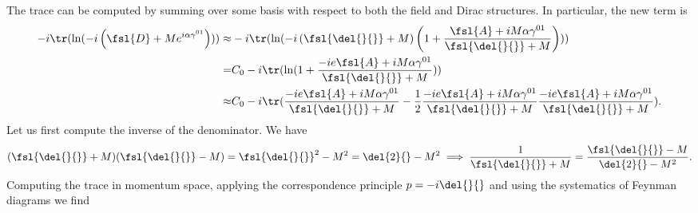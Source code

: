 The trace can be computed by summing over some basis with respect to both the field and Dirac structures. In particular, the new term is
\begin{align*}
	-i\tr(\ln(-i\left(\fsl{D} + Me^{i\alpha\gamma^{01}}\right))) \approx& 	-i\tr(\ln(-i\left(\fsl{\del{}{}} + M\right)\left(1 + \frac{\fsl{A} + iM\alpha\gamma^{01}}{\fsl{\del{}{}} + M}\right))) \\
	=& C_{0} - i\tr(\ln(1 + \frac{-ie\fsl{A} + iM\alpha\gamma^{01}}{\fsl{\del{}{}} + M})) \\
	\approx& C_{0} - i\tr(\frac{-ie\fsl{A} + iM\alpha\gamma^{01}}{\fsl{\del{}{}} + M} - \frac{1}{2}\frac{-ie\fsl{A} + iM\alpha\gamma^{01}}{\fsl{\del{}{}} + M}\frac{-ie\fsl{A} + iM\alpha\gamma^{01}}{\fsl{\del{}{}} + M}).
\end{align*}
Let us first compute the inverse of the denominator. We have
\begin{align*}
	(\fsl{\del{}{}} + M)(\fsl{\del{}{}} - M) = \fsl{\del{}{}}^{2} - M^{2} = \del{2}{} - M^{2} \implies \frac{1}{\fsl{\del{}{}} + M} = \frac{\fsl{\del{}{}} - M}{\del{2}{} - M^{2}}.
\end{align*}
Computing the trace in momentum space, applying the correspondence principle $p = -i\del{}{}$ and using the systematics of Feynman diagrams we find
